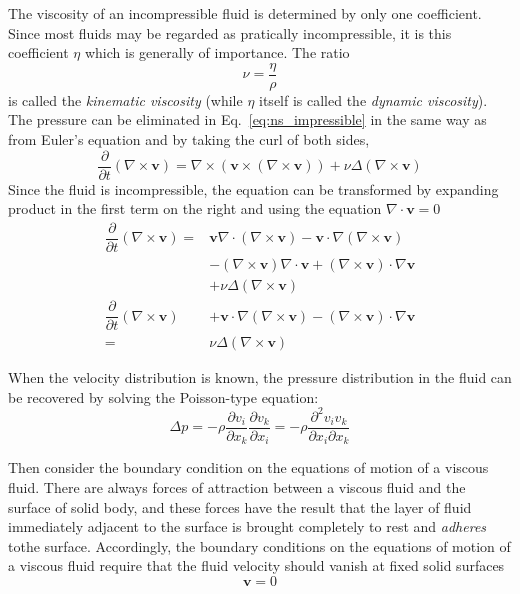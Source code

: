 \documentclass[conference]{IEEEtran}
\theoremstyle{definition}
\theoremstyle{remark}
\begin{document}
    The viscosity of an incompressible fluid is determined by only one coefficient. Since most fluids may be regarded as pratically incompressible, it is this coefficient $\eta$ which is generally of importance. The ratio
    \[
        \nu = \dfrac{\eta}{\rho}
    \]
    is called the \emph{kinematic viscosity} (while $\eta$ itself is called the \emph{dynamic viscosity}). The pressure can be eliminated in Eq.~\ref{eq:ns_impressible} in the same way as from Euler's equation and by taking the curl of both sides, 
    \[
        \dfrac{\partial}{\partial t} (\nabla \times \mathbf{v}) = \nabla \times (\mathbf{v} \times (\nabla \times \mathbf{v})) + \nu \Delta (\nabla \times \mathbf{v})
    \]
    Since the fluid is incompressible, the equation can be transformed by expanding product in the first term on the right and using the equation $\nabla \cdot \mathbf{v} = 0$
    \begin{align}
        \dfrac{\partial}{\partial t} (\nabla \times \mathbf{v}) =& \mathbf{v} \nabla \cdot (\nabla \times \mathbf{v}) - \mathbf{v} \cdot \nabla (\nabla \times \mathbf{v}) \nonumber \\
        &- (\nabla \times \mathbf{v}) \nabla \cdot \mathbf{v} + (\nabla \times \mathbf{v}) \cdot \nabla \mathbf{v} \nonumber \\
        &+ \nu \Delta (\nabla \times \mathbf{v}) \nonumber \\
        \dfrac{\partial}{\partial t} (\nabla \times \mathbf{v}) &+ \mathbf{v} \cdot \nabla (\nabla \times \mathbf{v}) -  (\nabla \times \mathbf{v}) \cdot \nabla \mathbf{v} \nonumber \\
        =& \nu \Delta (\nabla \times \mathbf{v})
    \end{align}

    When the velocity distribution is known, the pressure distribution in the fluid can be recovered by solving the Poisson-type equation:
    \begin{equation}
        \Delta p = -\rho \dfrac{\partial v_i}{\partial x_k} \dfrac{\partial v_k}{\partial x_i} = -\rho \dfrac{\partial^2 v_i v_k}{\partial x_i \partial x_k}
    \end{equation}

    Then consider the boundary condition on the equations of motion of a viscous fluid. There are always forces of attraction between a viscous fluid and the surface of solid body, and these forces have the result that the layer of fluid immediately adjacent to the surface is brought completely to rest and \emph{adheres} tothe surface. Accordingly, the boundary conditions on the equations of motion of a viscous fluid require that the fluid velocity should vanish at fixed solid surfaces
    \begin{equation}
        \mathbf{v} = 0
    \end{equation}
\end{document}
